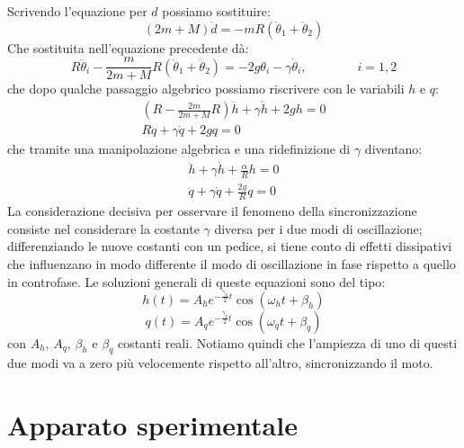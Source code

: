 \documentclass[11pt, a4paper, twoside]{article}
\begin{document}
Scrivendo l'equazione per $d$ possiamo sostituire:
\begin{equation}
  (2m + M) \ddot d = -mR (\ddot \theta_1 + \ddot \theta_2) 
  \label{equazionidissipative}
\end{equation}
Che sostituita nell'equazione precedente dà:
\begin{equation}
  R \ddot \theta_i -\frac{m}{2m + M}R (\ddot \theta_1 + \ddot \theta_2) 
  = - 2 g \theta_i  - \gamma   \dot \theta_i,\qquad \qquad i =1,2
  \label{equazionidissipative}
\end{equation}
che dopo qualche passaggio algebrico possiamo riscrivere con le variabili
$h$ e $q$:
\begin{equation}
  \begin{split}
  (R- \frac{2m}{2m + M}R) \ddot h + \gamma \dot h + 2g h  = 0 \\
  R \ddot q +\gamma \dot q + 2g q = 0 
  \end{split}
  \label{equazionidissipative}
\end{equation}
che tramite una manipolazione algebrica e una ridefinizione di
$\gamma$ diventano:
\begin{equation}
  \begin{split}
  \ddot h + \gamma \dot h + \frac{\alpha}{R} h  = 0 \\
  \ddot q +\gamma \dot q + \frac{2g}{R} q = 0 
  \end{split}
  \label{equazionidissipative}
\end{equation}
La considerazione decisiva per osservare il fenomeno della sincronizzazione 
consiste nel considerare la costante $\gamma$ diversa per i due modi di oscillazione;
differenziando le nuove costanti con un pedice, si tiene conto di 
effetti dissipativi che influenzano in modo differente il modo di oscillazione
in fase rispetto a quello in controfase.
Le soluzioni generali di queste equazioni sono del tipo:
\begin{equation}
    h(t) = A_h e^{- \frac{\gamma_h}{2} t} \cos(\omega_h t + \beta_h)
    \label{equazionefinaleh}
  \end{equation}
    \begin{equation}
    q(t) = A_q e^{- \frac{\gamma_q}{2} t} \cos(\omega_q t + \beta_q)
     \label{equazionefinaleq}
    \end{equation}
con $A_h$, $A_q$, $\beta_h$ e $\beta_q$ costanti reali.
Notiamo quindi che l'ampiezza di uno di questi due modi va a zero più velocemente rispetto 
all'altro, sincronizzando il moto.
\section{Apparato sperimentale}
\end{document}
